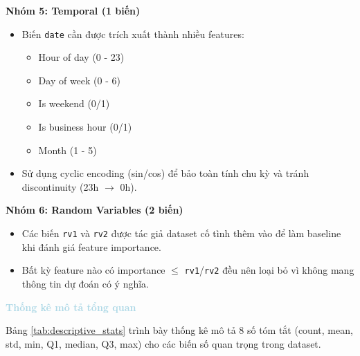 \textbf{Nhóm 5: Temporal (1 biến)}
\begin{itemize} [labelsep=10pt, leftmargin=2cm]
    \item Biến \texttt{date} cần được trích xuất thành nhiều features:
    \begin{itemize}
        \item[$\circ$] Hour of day (0 - 23)
        \item[$\circ$] Day of week (0 - 6)
        \item[$\circ$] Is weekend (0/1)
        \item[$\circ$] Is business hour (0/1)
        \item[$\circ$] Month (1 - 5)
    \end{itemize}
    
    \item Sử dụng cyclic encoding (sin/cos) để bảo toàn tính chu kỳ và tránh discontinuity (23h $\rightarrow$ 0h).
\end{itemize}

\textbf{Nhóm 6: Random Variables (2 biến)}
\begin{itemize} [labelsep=10pt, leftmargin=2cm]
    \item Các biến \texttt{rv1} và \texttt{rv2} được tác giả dataset cố tình thêm vào để làm baseline khi đánh giá feature importance.
    
    \item Bất kỳ feature nào có importance $\leq$ \texttt{rv1}/\texttt{rv2} đều nên loại bỏ vì không mang thông tin dự đoán có ý nghĩa.
\end{itemize}

\vspace{0.5em}
\noindent\textcolor{lightblue}{\textbf{Thống kê mô tả tổng quan}}
\vspace{0.5em}

Bảng \ref{tab:descriptive_stats} trình bày thống kê mô tả 8 số tóm tắt (count, mean, std, min, Q1, median, Q3, max) cho các biến số quan trọng trong dataset.

